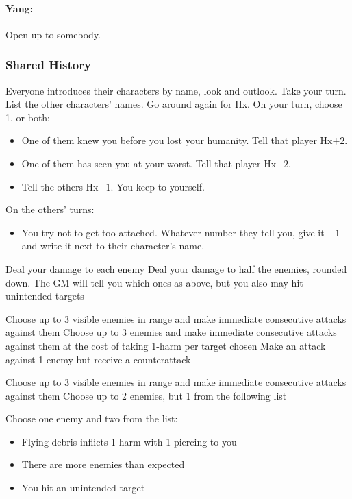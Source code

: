 \paragraph{Yang:} Open up to somebody.

\subsubsection{Shared History}
Everyone introduces their characters by name, look and outlook. Take
your turn.  List the other characters' names.  Go around again for
Hx. On your turn, choose 1, or both:
\begin{itemize}
\item One of them knew you before you lost your humanity. Tell that player Hx$+2$.
\item One of them has seen you at your worst. Tell that player Hx$-2$.
\item Tell the others Hx$-1$. You keep to yourself.
\end{itemize}
On the others’ turns:
\begin{itemize}
\item You try not to get too attached. Whatever number they tell you,
  give it $-1$ and write it next to their character’s name.
\end{itemize}

{Deal your damage to each enemy}
{Deal your damage to half the enemies, rounded down. The GM will tell you which ones}
{as above, but you also may hit unintended targets}

{Choose up to 3 visible enemies in range and make immediate consecutive attacks against them}
{Choose up to 3 enemies and make immediate consecutive attacks against them at the cost of taking 1-harm per target chosen}
{Make an attack against 1 enemy but receive a counterattack}

{Choose up to 3 visible enemies in range and make immediate consecutive attacks against them}
{Choose up to 2 enemies, but 1 from the following list}
{Choose one enemy and two from the list:
\begin{itemize}
\item Flying debris inflicts 1-harm with 1 piercing to you
\item There are more enemies than expected
\item You hit an unintended target
\end{itemize}}

